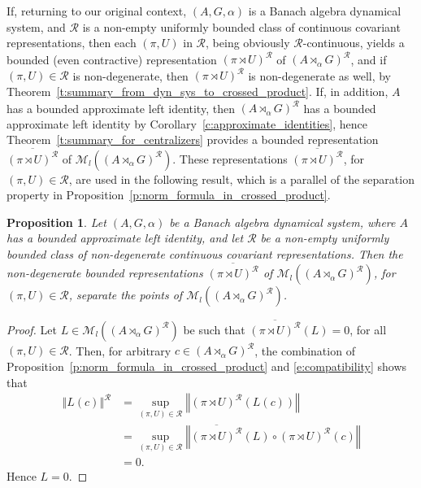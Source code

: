 \documentclass{amsart}
\theoremstyle{plain}
\newtheorem{prop}[theorem]{Proposition}
\theoremstyle{definition}
\numberwithin{equation}{section}
\begin{document}
If, returning to our original context, ${(A,G,\alpha)}$ is a Banach algebra dynamical system, and ${\mathcal R}$ is a non-empty uniformly bounded class of continuous covariant representations, then each ${(\pi,U)}$ in ${\mathcal R}$, being obviously ${\mathcal R}$-continuous, yields a bounded (even contractive) representation $({\pi \rtimes U})^{\mathcal R}$ of ${(A {\rtimes}_\alpha G)^\mathcal{R}}$, and if ${(\pi,U)}\in{\mathcal R}$ is non-degenerate, then $({\pi \rtimes U})^{\mathcal R}$ is non-degenerate as well, by Theorem~\ref{t:summary_from_dyn_sys_to_crossed_product}. If, in addition, $A$ has a bounded approximate left identity, then ${(A {\rtimes}_\alpha G)^\mathcal{R}}$ has a bounded approximate left identity by Corollary~\ref{c:approximate_identities}, hence Theorem~\ref{t:summary_for_centralizers} provides a bounded representation $\overline{({\pi \rtimes U})^{\mathcal R}}$ of $\mathcal M_l({(A {\rtimes}_\alpha G)^\mathcal{R}})$. These representations $\overline{({\pi \rtimes U})^{\mathcal R}}$, for ${(\pi,U)}\in{\mathcal R}$, are used in the following result, which is a parallel of the separation property in Proposition~\ref{p:norm_formula_in_crossed_product}.

\begin{prop}\label{p:representations_separate_left_centralizers}
 Let ${(A,G,\alpha)}$ be a Banach algebra dynamical system, where $A$ has a bounded approximate left identity, and let $\mathcal{R}$ be a non-empty uniformly bounded class of non-degenerate continuous covariant representations. Then the non-degenerate bounded representations $\overline{({\pi \rtimes U})^{\mathcal R}}$ of $\mathcal M_l({(A {\rtimes}_\alpha G)^\mathcal{R}})$, for ${(\pi,U)} \in \mathcal{R}$, separate the points of $\mathcal M_l({(A {\rtimes}_\alpha G)^\mathcal{R}})$.
\end{prop}

\begin{proof}
Let $L\in\mathcal M_l({(A {\rtimes}_\alpha G)^\mathcal{R}})$ be such that $\overline{({\pi \rtimes U})^{\mathcal R}} (L)=0$, for all ${(\pi,U)} \in \mathcal{R}$. Then, for arbitrary $c\in{(A {\rtimes}_\alpha G)^\mathcal{R}}$, the combination of Proposition~\ref{p:norm_formula_in_crossed_product} and \eqref{e:compatibility} shows that
\begin{align*}
{\left\Vert {L(c)} \right\Vert^{\mathcal R}}&= \sup_{{(\pi,U)} \in \mathcal{R}} {\left\Vert {({\pi \rtimes U})^{\mathcal R}(L(c))} \right\Vert}\\
&=\sup_{{(\pi,U)} \in \mathcal{R}} {\left\Vert {\overline{({\pi \rtimes U})^{\mathcal R}}(L)\circ({\pi \rtimes U})^{\mathcal R} (c)} \right\Vert}\\
&=0.
\end{align*}
Hence $L=0$.
\end{proof}
\end{document}
